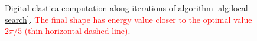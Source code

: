 \documentclass[smallextended]{svjour3}       %
\newcommand{\revision}[1]{\textcolor{red}{#1}}
\begin{document}
\begin{figure}[!h]
\center
{}
\caption{Digital elastica computation along iterations of algorithm \ref{alg:local-search}. \revision{The final shape has energy value closer to the optimal value $2\pi/5$ (thin horizontal dashed line)}.}
\label{fig:plot-elastica-local-search}
\end{figure}
\end{document}
